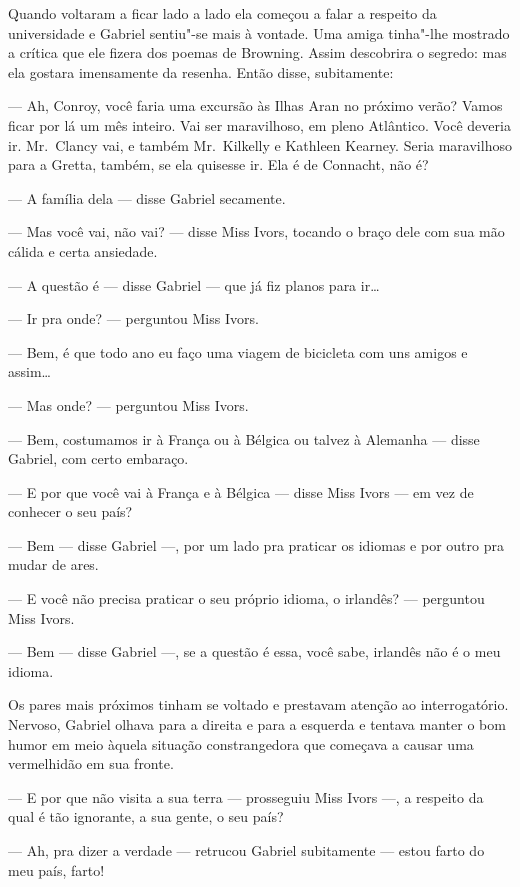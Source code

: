 Quando voltaram a ficar lado a lado ela começou a falar a respeito da
universidade e Gabriel sentiu"-se mais à vontade.  Uma amiga tinha"-lhe mostrado
a crítica que ele fizera dos poemas de Browning.  Assim descobrira o segredo:
mas ela gostara imensamente da resenha.  Então disse, subitamente:

--- Ah, Conroy, você faria uma excursão às Ilhas Aran no próximo verão?  Vamos
ficar por lá um mês inteiro.  Vai ser maravilhoso, em pleno Atlântico.  Você
deveria ir.  Mr.~Clancy vai, e também Mr.~Kilkelly e Kathleen Kearney.  Seria
maravilhoso para a Gretta, também, se ela quisesse ir.  Ela é de Connacht, não
é?

--- A família dela --- disse Gabriel secamente.

--- Mas você vai, não vai? --- disse Miss Ivors, tocando o braço dele com sua
mão cálida e certa ansiedade.

--- A questão é --- disse Gabriel --- que já fiz planos para ir\ldots{}

--- Ir pra onde? --- perguntou Miss Ivors.

--- Bem, é que todo ano eu faço uma viagem de bicicleta com uns amigos e
assim\ldots{}

--- Mas onde? --- perguntou Miss Ivors.

--- Bem, costumamos ir à França ou à Bélgica ou talvez à Alemanha --- disse
Gabriel, com certo embaraço.

--- E por que você vai à França e à Bélgica --- disse Miss Ivors --- em vez de
conhecer o seu país?

--- Bem --- disse Gabriel ---, por um lado pra praticar os idiomas e por outro
pra mudar de ares.

--- E você não precisa praticar o seu próprio idioma, o irlandês?  ---
perguntou Miss Ivors.

--- Bem --- disse Gabriel ---, se a questão é essa, você sabe, irlandês não é o
meu idioma.

Os pares mais próximos tinham se voltado e prestavam atenção ao interrogatório.
Nervoso, Gabriel olhava para a direita e para a esquerda e tentava manter o bom
humor em meio àquela situação constrangedora que começava a causar uma
vermelhidão em sua fronte.

--- E por que não visita a sua terra --- prosseguiu Miss Ivors ---, a respeito
da qual é tão ignorante, a sua gente, o seu país?

--- Ah, pra dizer a verdade --- retrucou Gabriel subitamente --- estou farto do
meu país, farto!


